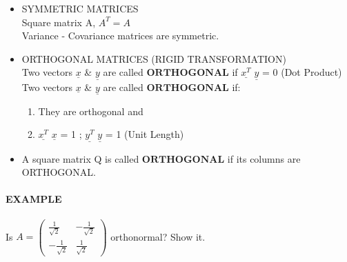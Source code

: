\documentclass[]{article}
\let\oldparagraph\paragraph
\renewcommand{\paragraph}[1]{\oldparagraph{#1}\mbox{}}
\begin{document}
\begin{itemize}
\item
  SYMMETRIC MATRICES\\

  Square matrix A, \(A^{T}=A\)\\
   Variance - Covariance matrices are symmetric.\\
\item
  ORTHOGONAL MATRICES (RIGID TRANSFORMATION)\\

  Two vectors \(\underline{x}\) \& \(\underline{y}\) are called
  \(\textbf{ORTHOGONAL}\) if \(\underline{x^{T}}\) \(\underline{y}\) = 0
  (Dot Product)\\

  Two vectors \(\underline{x}\) \& \(\underline{y}\) are called
  \(\textbf{ORTHOGONAL}\) if:\\

  \begin{enumerate}
  \def\labelenumi{\arabic{enumi})}
  \item
    They are orthogonal and
  \item
    \(\underline{x^{T}}\) \(\underline{x}\) = 1 ; \(\underline{y^{T}}\)
    \(\underline{y}\) = 1 (Unit Length)\\
  \end{enumerate}
\item
  A square matrix Q is called \(\textbf{ORTHOGONAL}\) if its columns are
  ORTHOGONAL.\\
\end{itemize}

\paragraph{\texorpdfstring{EXAMPLE\\
}{EXAMPLE }}\label{example-6}

Is
\(A =\begin{pmatrix} \frac{1}{\sqrt{2}} & -\frac{1}{\sqrt{2}} \\ -\frac{1}{\sqrt{2}} & \frac{1}{\sqrt{2}}\end{pmatrix}\)
orthonormal? Show it.\\
\end{document}
